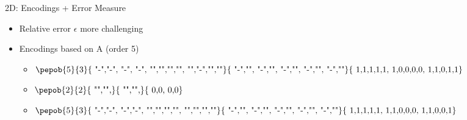 \begin{frame}{2D: Encodings + Error Measure}

    \begin{minipage}{.6\textwidth}
        \begin{itemize}
            \item Relative error $\epsilon$ more challenging
            \item Encodings based on A (order 5)
                  \begin{itemize}
                      \item {}$\vcenter{\hbox{\pepob{5}{3}{{
                                                    "-","-", "-",     "-",
                                                    "","","","",
                                                    "","-","",""}}{{
                                                    "-","",
                                                    "-","",
                                                    "-","",
                                                    "-","",
                                                    "-",""}}{{
                                                    1,1,1,1,1,
                                                    1,0,0,0,0,
                                                    1,1,0,1,1}} }} $
                      \item {}$\vcenter{\hbox{{\pepob{2}{2}{{
                                                            "","",}}{{
                                                            "","",}}{{
                                                            0,0,
                                                            0,0}}} }}$
                      \item {}$\vcenter{\hbox{\pepob{5}{3}{{
                                                    "-","-", "-","-",
                                                    "","","","",
                                                    "","","",""}}{{
                                                    "-","",
                                                    "-","",
                                                    "-","",
                                                    "-","",
                                                    "-",""}}{{
                                                    1,1,1,1,1,
                                                    1,1,0,0,0,
                                                    1,1,0,0,1}} }} $
                  \end{itemize}
        \end{itemize}


\end{minipage}
\end{frame}
